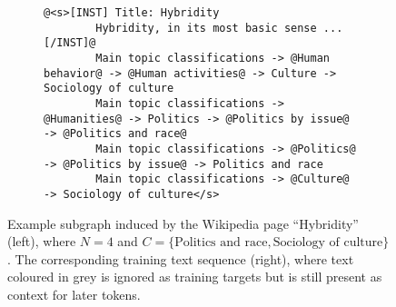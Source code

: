 \begin{figure}[t]
    \centering
    \begin{subfigure}[c]{0.34\textwidth}
        \centering
    \end{subfigure}%
    \hfill
    \begin{adjustbox}{varwidth=\linewidth,fbox}
    \begin{subfigure}[c]{0.55\textwidth}
        \centering
        \begin{lstlisting}[gobble=8,style=prompt]
        @<s>[INST] Title: Hybridity
        Hybridity, in its most basic sense ... [/INST]@
        Main topic classifications -> @Human behavior@ -> @Human activities@ -> Culture -> Sociology of culture
        Main topic classifications -> @Humanities@ -> Politics -> @Politics by issue@ -> @Politics and race@
        Main topic classifications -> @Politics@ -> @Politics by issue@ -> Politics and race
        Main topic classifications -> @Culture@ -> Sociology of culture</s>
        \end{lstlisting}
    \end{subfigure}
    \end{adjustbox}
    \caption{Example subgraph induced by the Wikipedia page ``Hybridity'' (left), where $N = 4$ and $C = \{\text{Politics and race}, \text{Sociology of culture}\}$.
    The corresponding training text sequence (right), where text coloured in grey is ignored as training targets but is still present as context for later tokens.}
    \label{fig:prompt-template}
\end{figure}